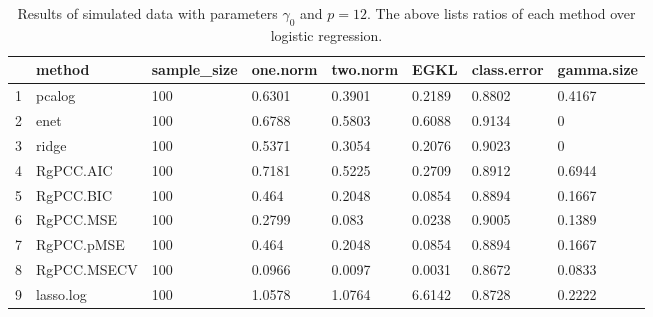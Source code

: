 \begin{table}[ht]
\centering
\begin{tabular}{rlllllll}
  \hline
 & method & sample\_size & one.norm & two.norm & EGKL & class.error & gamma.size \\ 
  \hline
1 & pcalog & 100 & 0.6301 & 0.3901 & 0.2189 & 0.8802 & 0.4167 \\ 
  2 & enet & 100 & 0.6788 & 0.5803 & 0.6088 & 0.9134 & 0 \\ 
  3 & ridge & 100 & 0.5371 & 0.3054 & 0.2076 & 0.9023 & 0 \\ 
  4 & RgPCC.AIC & 100 & 0.7181 & 0.5225 & 0.2709 & 0.8912 & 0.6944 \\ 
  5 & RgPCC.BIC & 100 & 0.464 & 0.2048 & 0.0854 & 0.8894 & 0.1667 \\ 
  6 & RgPCC.MSE & 100 & 0.2799 & 0.083 & 0.0238 & 0.9005 & 0.1389 \\ 
  7 & RgPCC.pMSE & 100 & 0.464 & 0.2048 & 0.0854 & 0.8894 & 0.1667 \\ 
  8 & RgPCC.MSECV & 100 & 0.0966 & 0.0097 & 0.0031 & 0.8672 & 0.0833 \\ 
  9 & lasso.log & 100 & 1.0578 & 1.0764 & 6.6142 & 0.8728 & 0.2222 \\ 
   \hline
\end{tabular}
\caption{Results of simulated data with parameters $\gamma_0$ and $p =12$. The above lists ratios of each method over logistic regression.} 
\label{fig-0-debug-new-algo-12-metrics-pratio}
\end{table}
